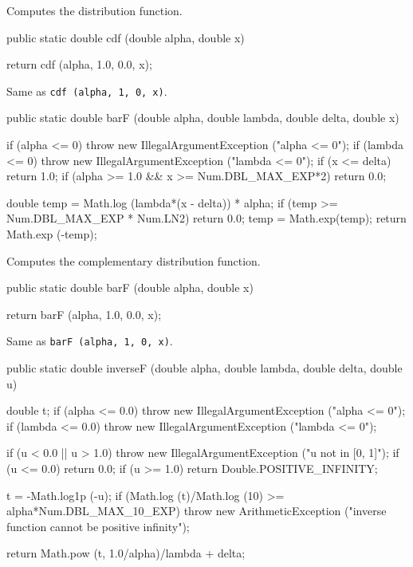  \begin{tabb}
  Computes the distribution function.
 \end{tabb}
\begin{code}

   public static double cdf (double alpha, double x)\begin{hide} {
      return cdf (alpha, 1.0, 0.0, x);
   }\end{hide}
\end{code}
\begin{tabb} Same as \texttt{cdf (alpha, 1, 0, x)}.
\end{tabb}
\begin{code}

   public static double barF (double alpha, double lambda,
                              double delta, double x)\begin{hide} {
      if (alpha <= 0)
        throw new IllegalArgumentException ("alpha <= 0");
      if (lambda <= 0)
        throw new IllegalArgumentException ("lambda <= 0");
      if (x <= delta)
         return 1.0;
      if (alpha >= 1.0 && x >= Num.DBL_MAX_EXP*2)
         return 0.0;

      double temp = Math.log (lambda*(x - delta)) * alpha;
      if (temp >= Num.DBL_MAX_EXP * Num.LN2)
         return 0.0;
      temp = Math.exp(temp);
      return Math.exp (-temp);
   }\end{hide}
\end{code}
  \begin{tabb}
 Computes  the complementary distribution function.
 \end{tabb}
\begin{code}

   public static double barF (double alpha, double x)\begin{hide} {
      return barF (alpha, 1.0, 0.0, x);
   }\end{hide}
\end{code}
\begin{tabb} Same as \texttt{barF (alpha, 1, 0, x)}.
\end{tabb}
\begin{code}

   public static double inverseF (double alpha, double lambda,
                                  double delta, double u)\begin{hide} {
        double t;
        if (alpha <= 0.0)
            throw new IllegalArgumentException ("alpha <= 0");
        if (lambda <= 0.0)
            throw new IllegalArgumentException ("lambda <= 0");

        if (u < 0.0 || u > 1.0)
            throw new IllegalArgumentException ("u not in [0, 1]");
        if (u <= 0.0)
           return 0.0;
        if (u >= 1.0)
           return Double.POSITIVE_INFINITY;

        t = -Math.log1p (-u);
        if (Math.log (t)/Math.log (10) >= alpha*Num.DBL_MAX_10_EXP)
           throw new ArithmeticException
              ("inverse function cannot be positive infinity");

        return Math.pow (t, 1.0/alpha)/lambda + delta;
   }\end{hide}
\end{code}
